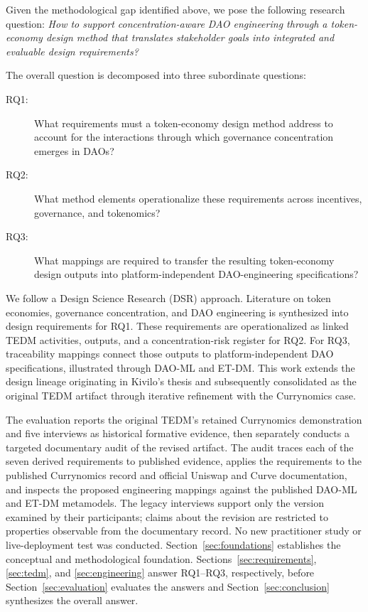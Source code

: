 \documentclass[referee,sn-basic]{sn-jnl}
\begin{document}
Given the methodological gap identified above, we pose the following research
question: \emph{How to support concentration-aware DAO engineering
through a token-economy design method that translates stakeholder goals into
integrated and evaluable design requirements?}

The overall question is decomposed into three subordinate questions:

\begin{description}
  \item[RQ1:] What requirements must a token-economy design method address to
  account for the interactions through which governance concentration emerges
  in DAOs?

  \item[RQ2:] What method elements operationalize these requirements across
  incentives, governance, and tokenomics?

  \item[RQ3:] What mappings are required to transfer the resulting token-economy
  design outputs into platform-independent DAO-engineering specifications?
\end{description}


We follow a Design Science Research (DSR) approach. Literature on token
economies, governance concentration, and DAO engineering is synthesized into
design requirements for RQ1. These requirements are operationalized as linked
TEDM activities, outputs, and a concentration-risk register for RQ2. For RQ3,
traceability mappings connect those outputs to platform-independent DAO
specifications, illustrated through DAO-ML and ET-DM. This work extends the
design lineage originating in Kivilo's thesis and subsequently consolidated as
the original TEDM artifact through iterative refinement with the Currynomics
case.

The evaluation reports the original TEDM's retained Currynomics demonstration
and five interviews as historical formative evidence, then separately conducts
a targeted documentary audit of the revised artifact. The audit traces each of
the seven derived requirements
to published evidence, applies the requirements to the published Currynomics
record and official Uniswap and Curve documentation, and inspects the proposed
engineering mappings against the published DAO-ML and ET-DM metamodels. The
legacy interviews support only the version examined by their participants;
claims about the revision are restricted to properties observable from the
documentary record.
No new practitioner study or live-deployment test was conducted.
Section~\ref{sec:foundations} establishes the conceptual and methodological
foundation. Sections~\ref{sec:requirements}, \ref{sec:tedm}, and
\ref{sec:engineering} answer RQ1--RQ3, respectively, before
Section~\ref{sec:evaluation} evaluates the answers and
Section~\ref{sec:conclusion} synthesizes the overall answer.
\end{document}
